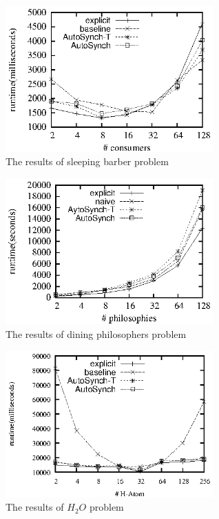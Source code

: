 \documentclass[preprint]{sigplanconf}
\begin{document}
\begin{figure}[ht!]
  \centering
  \includegraphics[width=80mm]{fig/sb.eps}
  \caption{The results of sleeping barber problem}
  \label{fig:sb_eval}
\end{figure}

\begin{figure}[ht!]
  \centering
  \includegraphics[width=80mm]{fig/dp.eps}
  \caption{The results of dining philosophers problem}
  \label{fig:sb_eval}
\end{figure}

\begin{figure}[ht!]
  \centering
  \includegraphics[width=80mm]{fig/h2o.eps}
  \caption{The results of $H_2O$ problem}
  \label{fig:h2o_eval}
\end{figure}

\end{document}
